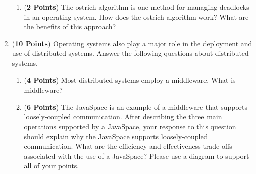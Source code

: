 \documentclass[12pt,epsf,psfig,graphics]{article}
\begin{document}
\begin{enumerate}
\begin{enumerate}
    \item ({\bf 2 Points}) The ostrich algorithm is one method for managing deadlocks in an operating system.  How does
      the ostrich algorithm work? What are the benefits of this approach?

  \end{enumerate}

  \newpage

\item ({\bf 10 Points}) Operating systems also play a major role in the deployment and use of distributed systems.
  Answer the following questions about distributed systems.

  \begin{enumerate}

    \item ({\bf 4 Points}) Most distributed systems employ a middleware.  What is middleware?

    \item ({\bf 6 Points}) The JavaSpace is an example of a middleware that supports loosely-coupled communication.
      After describing the three main operations supported by a JavaSpace, your response to this question should explain
      why the JavaSpace supports loosely-coupled communication. What are the efficiency and effectiveness trade-offs
      associated with the use of a JavaSpace? Please use a diagram to support all of your points.

  \end{enumerate}

\end{enumerate}
\end{document}
